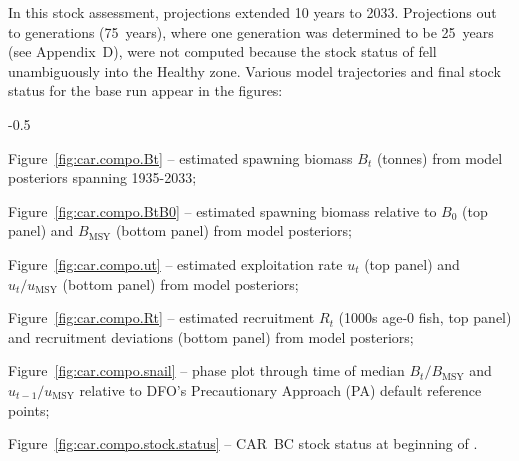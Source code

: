 \documentclass[11pt]{book}
\newcommand{\Bmsy}{B_\text{MSY}}
\newcommand{\umsy}{u_\text{MSY}}
\begin{document}


In this stock assessment, projections extended 10 years to 2033. 
Projections out to  generations (75~years), where one generation was determined to be 25~years (see Appendix~D), were not computed because the stock status of \SPC{} fell unambiguously into the Healthy zone.
Various model trajectories and final stock status for the base run appear in the figures:
\begin{itemize_csas}{-0.5}{}
  \item Figure~\ref{fig:car.compo.Bt}     -- estimated spawning biomass $B_t$ (tonnes) from model posteriors spanning 1935-2033;
  \item Figure~\ref{fig:car.compo.BtB0}   -- estimated spawning biomass relative to $B_0$ (top panel) and $\Bmsy$ (bottom panel) from model posteriors;
  \item Figure~\ref{fig:car.compo.ut}     -- estimated exploitation rate $u_t$ (top panel) and $u_t/\umsy$ (bottom panel) from model posteriors;
  \item Figure~\ref{fig:car.compo.Rt}     -- estimated recruitment $R_t$ (1000s age-0 fish, top panel) and recruitment deviations (bottom panel) from model posteriors;
  \item Figure~\ref{fig:car.compo.snail}  -- phase plot through time of median $B_t/\Bmsy$ and $u_{t-1}/\umsy$ relative to DFO's Precautionary Approach (PA) default reference points;
  \item Figure~\ref{fig:car.compo.stock.status} -- CAR~BC stock status at beginning of \currYear{}.
\end{itemize_csas}
\end{document}
